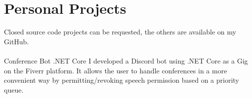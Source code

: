 \section*{Personal Projects}
\footnotesize
Closed source code projects can be requested, the others are available on my GitHub.\\\\
\normalsize
\tech
  {Conference Bot}
  {.NET Core}
  {I developed a Discord bot using .NET Core as a Gig on the Fiverr platform.
   It allows the user to handle conferences in a more convenient way by permitting/revoking speech permission based on a priority queue.}

